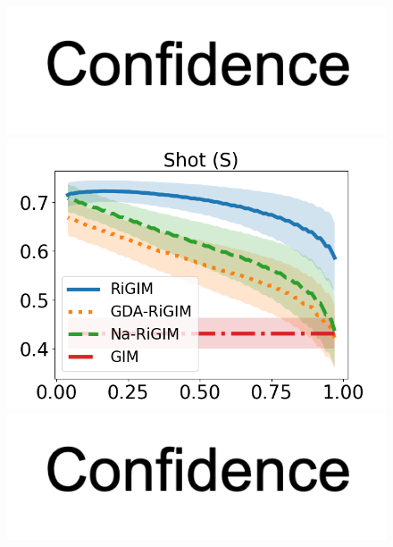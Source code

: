 \documentclass[letterpaper]{article} %
\begin{document}
\begin{figure}[htbp]
\begin{minipage}{0.16\textwidth}
    \vspace{-0.05in}
    \includegraphics[scale=0.12]{figures/confidence_x_label.png}
    \end{minipage}
    \begin{minipage}{0.16\textwidth}
    \centering
    \includegraphics[scale=0.16]{figures/risk_curve_S_shadow.png}\par
    \vspace{-0.05in}
    \includegraphics[scale=0.12]{figures/confidence_x_label.png}
    \end{minipage}
    \begin{minipage}{0.16\textwidth}
    \centering

\end{minipage}
\end{figure}
\end{document}

